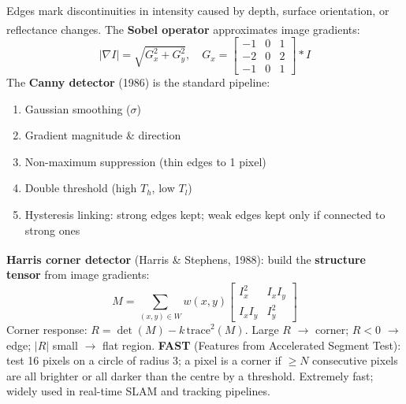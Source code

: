 \begin{tcbitemize}[ skin=sectionraster ]
    \tcbitem[title={Edge Detection and the Canny Detector}, raster multicolumn=3]
    Edges mark discontinuities in intensity caused by depth, surface orientation, or reflectance changes.
    The \textbf{Sobel operator} approximates image gradients\textsuperscript{\cite[][pp.~693--706]{gonzalezWoods2018}}:
    \begin{equation}
        |\nabla I| = \sqrt{G_x^2 + G_y^2}, \quad
        G_x = \begin{bmatrix}-1&0&1\\-2&0&2\\-1&0&1\end{bmatrix} * I
    \end{equation}
    The \textbf{Canny detector} (1986) is the standard pipeline:
    \begin{enumerate}
        \item Gaussian smoothing ($\sigma$)
        \item Gradient magnitude \& direction
        \item Non-maximum suppression (thin edges to 1 pixel)
        \item Double threshold (high $T_h$, low $T_l$)
        \item Hysteresis linking: strong edges kept; weak edges kept only if connected to strong ones
    \end{enumerate}

    \tcbitem[title={Harris Corners and FAST}, raster multicolumn=3]
    \textbf{Harris corner detector} (Harris \& Stephens, 1988)\textsuperscript{\cite[][pp.~215--220]{szeliski2022}}:
    build the \textbf{structure tensor} from image gradients:
    \begin{equation}
        M = \sum_{(x,y) \in W} w(x,y) \begin{bmatrix} I_x^2 & I_xI_y \\ I_xI_y & I_y^2 \end{bmatrix}
    \end{equation}
    Corner response: $R = \det(M) - k\,\mathrm{trace}^2(M)$.
    Large $R$ $\to$ corner; $R < 0$ $\to$ edge; $|R|$ small $\to$ flat region.
    \tcblower
    \textbf{FAST} (Features from Accelerated Segment Test): test 16 pixels on a circle of radius 3; a pixel is a corner if $\geq N$ consecutive pixels are all brighter or all darker than the centre by a threshold.
    Extremely fast; widely used in real-time SLAM and tracking pipelines.


\end{tcbitemize}
